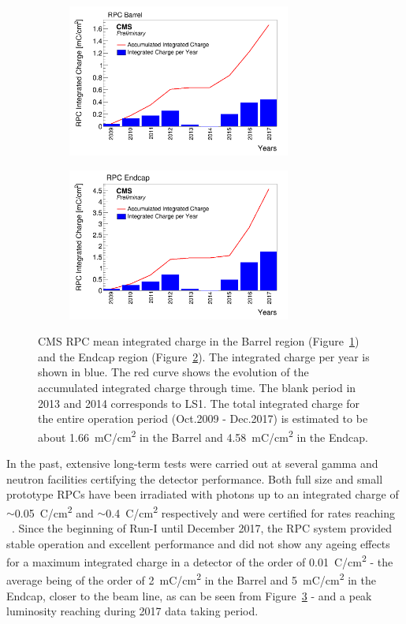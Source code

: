 	\begin{figure}[H]
		\begin{subfigure}{0.5\linewidth}
			\centering
			\includegraphics[height=5cm]{fig/chapt5/Mean-Int-charge-Barrel.png}
			\caption{\label{fig:Mean-Int-Charge:A}}
		\end{subfigure}
		\begin{subfigure}{0.5\linewidth}
			\centering
			\includegraphics[height=5cm]{fig/chapt5/Mean-Int-charge-Endcap.png}
			\caption{\label{fig:Mean-Int-Charge:B}}
		\end{subfigure}
		\caption{\label{fig:Mean-Int-Charge} CMS RPC mean integrated charge in the Barrel region (Figure~\ref{fig:Mean-Int-Charge:A}) and the Endcap region (Figure~\ref{fig:Mean-Int-Charge:B}). The integrated charge per year is shown in blue. The red curve shows the evolution of the accumulated integrated charge through time. The blank period in 2013 and 2014 corresponds to LS1. The total integrated charge for the entire operation period (Oct.2009 - Dec.2017) is estimated to be about \SI{1.66}{mC/cm^2} in the Barrel and \SI{4.58}{mC/cm^2} in the Endcap.}
	\end{figure}

	In the past, extensive long-term tests were carried out at several gamma and neutron facilities certifying the detector performance. Both full size and small prototype RPCs have been irradiated with photons up to an integrated charge of $\sim$\SI{0.05}{C/cm^2} and $\sim$\SI{0.4}{C/cm^2} respectively and were certified for rates reaching ~\cite{GIF2004,AGING2009}. Since the beginning of Run-I until December 2017, the RPC system provided stable operation and excellent performance and did not show any ageing effects for a maximum integrated charge in a detector of the order of \SI{0.01}{C/cm^2} - the average being of the order of \SI{2}{mC/cm^2} in the Barrel and \SI{5}{mC/cm^2} in the Endcap, closer to the beam line, as can be seen from Figure~\ref{fig:Mean-Int-Charge} - and a peak luminosity reaching  \siflux during 2017 data taking period.
	
